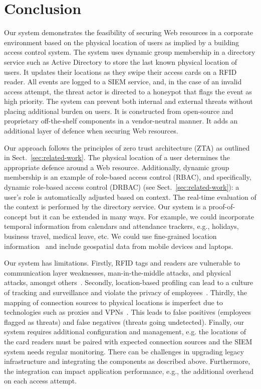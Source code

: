 \section{Conclusion}\label{sec:conclusion}

Our system demonstrates the feasibility of securing Web resources in a
corporate environment based on the physical location of users as
implied by a building access control system.  The system uses dynamic
group membership in a directory service such as Active Directory to
store the last known physical location of users.  It updates their
locations as they swipe their access cards on a RFID reader.  All
events are logged to a SIEM service, and, in the case of an invalid
access attempt, the threat actor is directed to a honeypot that flags
the event as high priority.  The system can prevent both internal and
external threats without placing additional burden on users.  It is
constructed from open-source and proprietary off-the-shelf components
in a vendor-neutral manner.  It adds an additional layer of defence
when securing Web resources.

Our approach follows the principles of zero trust architecture (ZTA)
as outlined in Sect.~\ref{sec:related-work}.  The physical location of
a user determines the appropriate defence around a Web resource.
Additionally, dynamic group membership is an example of role-based
access control (RBAC), and specifically, dynamic role-based access
control (DRBAC) (see Sect.~\ref{sec:related-work}): a user's role is
automatically adjusted based on context.  The real-time evaluation of
the context is performed by the directory service.  Our system is a
proof-of-concept but it can be extended in many ways.  For example, we
could incorporate temporal information from calendars and attendance
trackers, e.g., holidays, business travel, medical leave, etc.  We
could use fine-grained location information~\cite{kriplean-et-al-07}
and include geospatial data from mobile devices and laptops.

Our system has limitations.  Firstly, RFID tags and readers are
vulnerable to communication layer weaknesses, man-in-the-middle
attacks, and physical attacks, amongst
others~\cite{ranasinghe-cole-06}.  Secondly, location-based profiling
can lead to a culture of tracking and surveillance and violate the
privacy of employees~\cite{ostojic-et-al-07}.  Thirdly, the mapping of
connection sources to physical locations is imperfect due to
technologies such as proxies and VPNs~\cite{luna-21}.  This leads to
false positives (employees flagged as threats) and false negatives
(threats going undetected).  Finally, our system requires additional
configuration and management, e.g. the locations of the card readers
must be paired with expected connection sources and the SIEM system
needs regular monitoring.  There can be challenges in upgrading legacy
infrastructure and integrating the components as described above.
Furthermore, the integration can impact application performance, e.g.,
the additional overhead on each access attempt.

